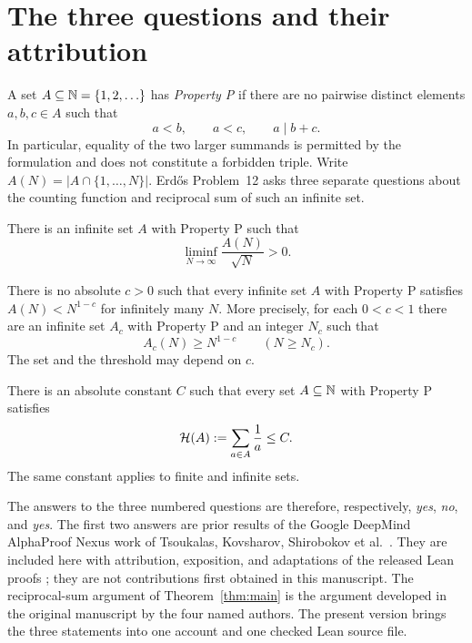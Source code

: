 \section{The three questions and their attribution}\label{sec:introduction}

A set \(A\subseteq\mathbb N=\{1,2,\ldots\}\) has \emph{Property P} if there
are no pairwise distinct elements \(a,b,c\in A\) such that
\[
 a<b,\qquad a<c,\qquad a\mid b+c.
\]
In particular, equality of the two larger summands is permitted by the
formulation and does not constitute a forbidden triple. Write
\(A(N)=|A\cap\{1,\ldots,N\}|\).
Erd\H{o}s Problem~12 asks three separate questions about the counting
function and reciprocal sum of such an infinite set.

\begin{theorem}\label{thm:part-i}
There is an infinite set \(A\) with Property P such that
\[
 \liminf_{N\to\infty}\frac{A(N)}{\sqrt N}>0.
\]
\end{theorem}

\begin{theorem}\label{thm:part-ii}
There is no absolute \(c>0\) such that every infinite set \(A\) with
Property P satisfies \(A(N)<N^{1-c}\) for infinitely many \(N\).
More precisely, for each \(0<c<1\) there are an infinite set \(A_c\)
with Property P and an integer \(N_c\) such that
\begin{equation}\label{eq:parameterwise-dense}
 A_c(N)\ge N^{1-c}\qquad(N\ge N_c).
\end{equation}
The set and the threshold may depend on \(c\).
\end{theorem}

\begin{theorem}\label{thm:main}
There is an absolute constant \(C\) such that every set
\(A\subseteq\mathbb N\) with Property P satisfies
\begin{equation}\label{eq:main}
 \mathcal H(A):=\sum_{a\in A}\frac1a\le C.
\end{equation}
The same constant applies to finite and infinite sets.
\end{theorem}

The answers to the three numbered questions are therefore, respectively,
\emph{yes}, \emph{no}, and \emph{yes}. The first two answers are prior
results of the Google DeepMind AlphaProof Nexus work of Tsoukalas,
Kovsharov, Shirobokov et al.\ \cite{TKS}. They are included here with
attribution, exposition, and adaptations of the released Lean proofs
\cite{NexusI,NexusII}; they are not contributions first obtained in this
manuscript. The reciprocal-sum argument of Theorem~\ref{thm:main} is the
argument developed in the original manuscript by the four named authors.
The present version brings the three statements into one account and one
checked Lean source file.

